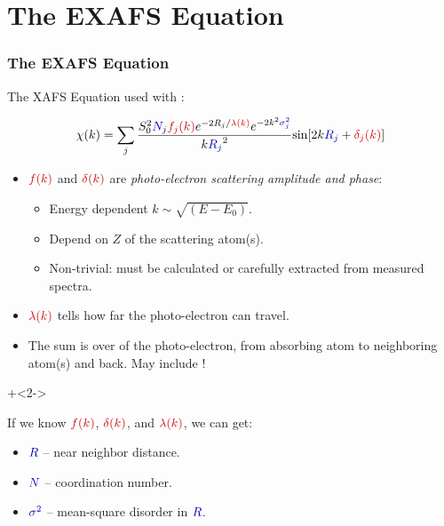 \section{The EXAFS Equation}

\begin{frame}
  \frametitle{The EXAFS Equation}  %

\begin{cenpage}{110mm}

  The XAFS Equation used with {\feff}:

  \[
  \chi(k) = \sum_j {{ S_0^2 {\Blue{N_j}} {\Red{f_j(k)}}  e^{-2R_j/{\Red{\lambda(k)}}}
      e^{-2k^2{\Blue{\sigma_j^2}}}}\over{k{\Blue{R_j}}^2}}
  {\sin[{2k{\Blue{R_j}} + {\Red{\delta_j(k)}}} ]}
   \]

\begin{itemize}
  \item $\Red{f(k)}$ and $\Red{\delta(k)}$ are  {\emph{photo-electron scattering
        amplitude and phase}}:
    \begin{itemize}
    \item Energy dependent    \hspace{3mm}  $k \sim \sqrt{(E-E_0)} $.
    \item Depend on $Z$ of the scattering atom(s).
    \item Non-trivial: must be calculated or carefully extracted from  measured spectra.
    \end{itemize}

\item $\Red{\lambda(k)}$ tells how far the photo-electron can travel.

\item The sum is over {} of the photo-electron,
  from absorbing atom to neighboring atom(s) and back.  May include
  {}!

\end{itemize}

   \onslide+<2->

   \begin{postitbox}{64mm}
     If we know $\Red{f(k)}$,  $\Red{\delta(k)}$, and $\Red{\lambda(k)}$, we can get:
     \begin{itemize}
     \item ${\Blue{R}}$ --  near neighbor distance.
     \item ${\Blue{N}}$ -- coordination number.
     \item ${\Blue{\sigma^2}}$ -- mean-square  disorder in ${\Blue{R}}$.
     \end{itemize}
   \end{postitbox}

\end{cenpage}
\end{frame}




